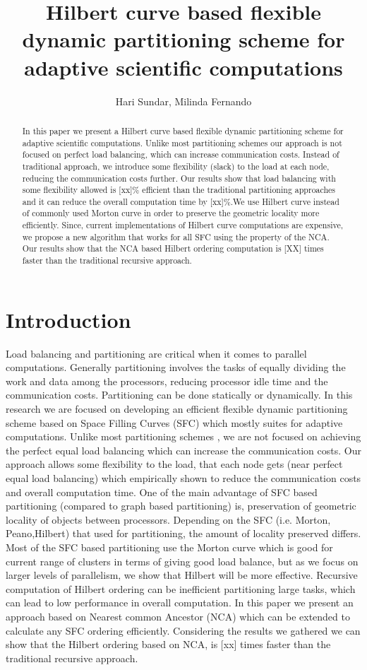 \documentclass[a4paper,10pt]{article}
\title{Hilbert curve based flexible dynamic partitioning scheme for adaptive scientific computations}
\author{Hari Sundar, Milinda Fernando}
\date{}
\begin{document}
\maketitle

\begin{abstract}
In this paper we present a Hilbert curve based flexible dynamic partitioning scheme for adaptive scientific computations. Unlike most partitioning schemes our approach is not focused on perfect load
balancing, which can increase communication costs. Instead of traditional approach, we introduce some flexibility (slack) to the load at each node, reducing the communication costs further. Our results
show that load balancing with some flexibility allowed is [xx]\% efficient than the traditional partitioning approaches and it can reduce the overall computation time by [xx]\%.We use Hilbert curve instead
of commonly used Morton curve in order to preserve the geometric locality more efficiently. Since, current implementations of Hilbert curve computations are expensive, we propose a new algorithm that works
for all SFC using the property of the NCA. Our results show that the NCA based Hilbert ordering computation is [XX] times faster than the traditional recursive approach. 
\end{abstract}

\section{Introduction}
Load balancing and partitioning are critical when it comes to parallel computations. Generally partitioning involves the tasks of equally dividing the work and data among the processors,
reducing processor idle time and the communication costs. Partitioning can be done statically or dynamically. In this research we are focused on developing an efficient flexible dynamic
partitioning scheme based on Space Filling Curves (SFC) which mostly suites for adaptive computations. Unlike most partitioning schemes , we are not focused on achieving the
perfect equal load balancing which can increase the communication costs. Our approach allows some flexibility to the load, that each node gets (near perfect equal load balancing) which
empirically shown to reduce the communication costs and overall computation time. One of the main advantage of SFC based partitioning (compared to graph based partitioning) is,
preservation of geometric locality of objects between processors. Depending on the SFC (i.e. Morton, Peano,Hilbert) that used for partitioning, the amount of locality preserved differs. 
Most of the SFC based partitioning use the Morton curve which is good for current range of clusters in terms of giving good load balance, but as we focus on larger levels of parallelism,
we show that Hilbert will be more effective. Recursive computation of Hilbert ordering can be inefficient partitioning large tasks, which can lead to low performance in overall computation.
In this paper we present an approach based on Nearest common Ancestor (NCA) which can be extended to calculate any SFC ordering efficiently. Considering the results we gathered we can show that
the Hilbert ordering based on NCA, is [xx] times faster than the traditional recursive approach.
\end{document}
